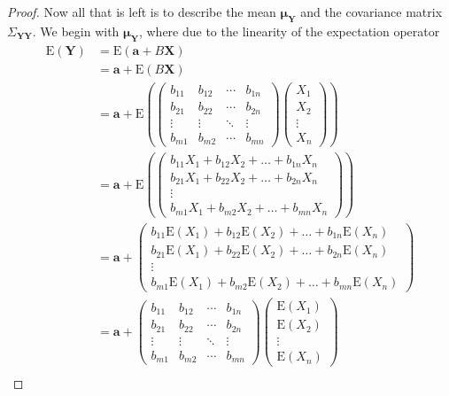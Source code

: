 \documentclass[12pt]{article}
\theoremstyle{definition}
\newcommand{\E}{\text{E}}
\newcommand{\vect}[1]{\boldsymbol{#1}}
\begin{document}
\begin{proof}
  Now all that is left is to describe the mean $\vect{\mu_Y}$ and the covariance
  matrix $\Sigma_{\vect{Y}\vect{Y}}$. We begin with $\vect{\mu_Y}$, where due to the linearity
  of the expectation operator
  \begin{align*}
    \E(\vect{Y})
    &= \E(\vect{a} + B\vect{X}) \\
    &= \vect{a} + \E(B\vect{X}) \\
    &= \vect{a} + \E\left(\begin{pmatrix} b_{11} & b_{12} & \cdots & b_{1n} \\ b_{21} & b_{22} & \cdots & b_{2n} \\ \vdots & \vdots & \ddots & \vdots \\ b_{m1} & b_{m2} & \cdots & b_{mn} \end{pmatrix}\begin{pmatrix} X_1 \\ X_2 \\ \vdots \\ X_n \end{pmatrix}\right) \\
    &= \vect{a} + \E\left(\begin{pmatrix} b_{11}X_1 + b_{12}X_2 + \dots + b_{1n}X_n \\ b_{21}X_1 + b_{22}X_2 + \dots + b_{2n}X_n \\ \vdots \\ b_{m1}X_1 + b_{m2}X_2 + \dots + b_{mn}X_n \end{pmatrix}\right) \\
    &= \vect{a} + \begin{pmatrix} b_{11}\E(X_1) + b_{12}\E(X_2) + \dots + b_{1n}\E(X_n) \\ b_{21}\E(X_1) + b_{22}\E(X_2) + \dots + b_{2n}\E(X_n) \\ \vdots \\ b_{m1}\E(X_1) + b_{m2}\E(X_2) + \dots + b_{mn}\E(X_n) \end{pmatrix} \\
    &= \vect{a} + \begin{pmatrix} b_{11} & b_{12} & \cdots & b_{1n} \\ b_{21} & b_{22} & \cdots & b_{2n} \\ \vdots & \vdots & \ddots & \vdots \\ b_{m1} & b_{m2} & \cdots & b_{mn} \end{pmatrix} \begin{pmatrix} \E(X_1) \\ \E(X_2) \\ \vdots \\ \E(X_n) \end{pmatrix} \\

\end{align*}
\end{proof}
\end{document}
